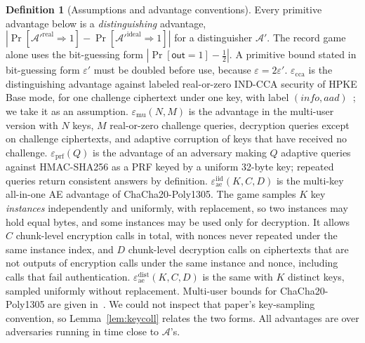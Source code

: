 \documentclass[pdflatex,sn-mathphys-num,twocolumn]{sn-jnl}
\theoremstyle{plain}
\theoremstyle{definition}
\newtheorem{definition}[theorem]{Definition}
\begin{document}
\begin{definition}[Assumptions and advantage conventions]\label{def:assumptions}
Every primitive advantage below is a \emph{distinguishing} advantage, $|\Pr[\mathcal A'^{\mathrm{real}}\Rightarrow1]-\Pr[\mathcal A'^{\mathrm{ideal}}\Rightarrow1]|$ for a distinguisher $\mathcal A'$. The record game alone uses the bit-guessing form $|\Pr[\mathsf{out}=1]-\tfrac12|$. A primitive bound stated in bit-guessing form $\varepsilon'$ must be doubled before use, because $\varepsilon=2\varepsilon'$.
$\varepsilon_{\mathrm{cca}}$ is the distinguishing advantage against labeled real-or-zero IND-CCA security of HPKE Base mode, for one challenge ciphertext under one key, with label $(\mathit{info},\mathit{aad})$~\cite{rfc9180}; we take it as an assumption. $\varepsilon_{\mathrm{mu}}(N,M)$ is the advantage in the multi-user version with $N$ keys, $M$ real-or-zero challenge queries, decryption queries except on challenge ciphertexts, and adaptive corruption of keys that have received no challenge. $\varepsilon_{\mathrm{prf}}(Q)$ is the advantage of an adversary making $Q$ adaptive queries against HMAC-SHA256 as a PRF keyed by a uniform 32-byte key; repeated queries return consistent answers by definition. $\varepsilon^{\mathrm{iid}}_{\mathrm{ae}}(K,C,D)$ is the multi-key all-in-one AE advantage of ChaCha20-Poly1305. The game samples $K$ key \emph{instances} independently and uniformly, with replacement, so two instances may hold equal bytes, and some instances may be used only for decryption. It allows $C$ chunk-level encryption calls in total, with nonces never repeated under the same instance index, and $D$ chunk-level decryption calls on ciphertexts that are not outputs of encryption calls under the same instance and nonce, including calls that fail authentication. $\varepsilon^{\mathrm{dist}}_{\mathrm{ae}}(K,C,D)$ is the same with $K$ distinct keys, sampled uniformly without replacement. Multi-user bounds for ChaCha20-Poly1305 are given in~\cite{degabriele2021}. We could not inspect that paper's key-sampling convention, so Lemma~\ref{lem:keycoll} relates the two forms. All advantages are over adversaries running in time close to $\mathcal A$'s.
\end{definition}
\end{document}
